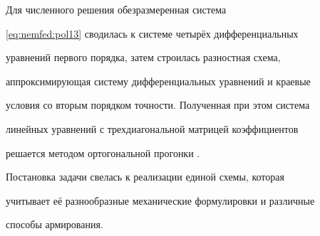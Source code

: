 Для численного решения обезразмеренная система

\eqref{eq:nemfed:pol13} сводилась к системе четырёх дифференциальных

уравнений первого порядка, затем строилась разностная схема,

аппроксимирующая систему дифференциальных уравнений и краевые

условия со вторым порядком точности. Полученная при этом система

линейных уравнений с трехдиагональной матрицей коэффициентов

решается методом ортогональной прогонки \cite{nemfed:bib:ORPUL}.



Постановка задачи свелась к реализации единой схемы, которая

учитывает её разнообразные механические формулировки и различные

способы армирования.



